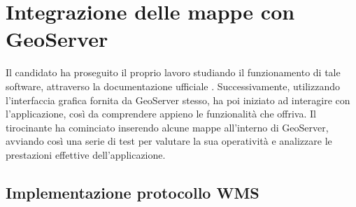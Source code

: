 \section{Integrazione delle mappe con GeoServer}

Il candidato ha proseguito il proprio lavoro studiando il funzionamento di tale software, attraverso la documentazione ufficiale \cite{DocumentazioneGeoServer}. Successivamente, utilizzando l'interfaccia grafica fornita da GeoServer stesso, ha poi iniziato ad interagire con l'applicazione, così da comprendere appieno le funzionalità che offriva. Il tirocinante ha cominciato inserendo alcune mappe all'interno di GeoServer, avviando così una serie di test per valutare la sua operatività e analizzare le prestazioni effettive dell'applicazione.

\subsection{Implementazione protocollo WMS}

